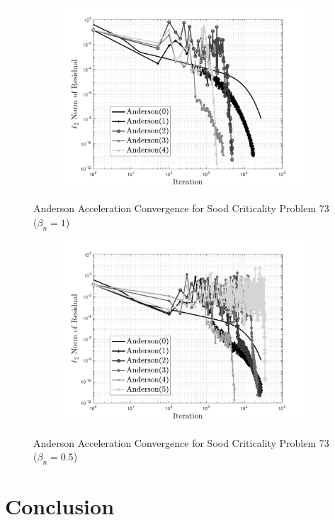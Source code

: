\begin{figure}[!htbp]
\centering
\begin{subfigure}{\textwidth}
  \centering
  \includegraphics[width=.75\linewidth]{Figures/AndersonAcceleration/SoodProb73}
\end{subfigure}
\caption{Anderson Acceleration Convergence for Sood Criticality Problem 73 ($\beta_{n} = 1$)}
\label{fig:AASoodProb73}
\end{figure}

\begin{figure}[!htbp]
\centering
\begin{subfigure}{\textwidth}
  \centering
  \includegraphics[width=.75\linewidth]{Figures/AndersonAcceleration/SoodProb73_FPI1_HalfBeta}
\end{subfigure}
\caption{Anderson Acceleration Convergence for Sood Criticality Problem 73 ($\beta_{n} = 0.5$)}
\label{fig:AASoodProb73Half}
\end{figure}

\clearpage

\section{Conclusion}
